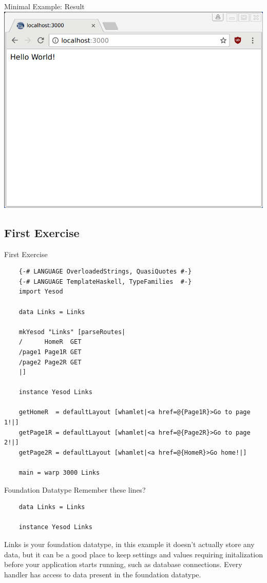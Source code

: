 \documentclass[pdf]{beamer}
\begin{document}
\begin{frame}{Minimal Example: Result}
  \includegraphics[width=\textwidth,height=0.8\textheight,keepaspectratio]{example}
\end{frame}

\subsection{First Exercise}
\begin{frame}[fragile]{First Exercise}
  \begin{verbatim}
    {-# LANGUAGE OverloadedStrings, QuasiQuotes #-}
    {-# LANGUAGE TemplateHaskell, TypeFamilies  #-}
    import Yesod

    data Links = Links

    mkYesod "Links" [parseRoutes|
    /      HomeR  GET
    /page1 Page1R GET
    /page2 Page2R GET
    |]

    instance Yesod Links

    getHomeR  = defaultLayout [whamlet|<a href=@{Page1R}>Go to page 1!|]
    getPage1R = defaultLayout [whamlet|<a href=@{Page2R}>Go to page 2!|]
    getPage2R = defaultLayout [whamlet|<a href=@{HomeR}>Go home!|]

    main = warp 3000 Links
  \end{verbatim}
\end{frame}

\begin{frame}[fragile]{Foundation Datatype}
  Remember these lines?
  \begin{verbatim}
    data Links = Links

    instance Yesod Links
  \end{verbatim}
  \pause
  
  Links is your foundation datatype, in this example it doesn't
  actually store any data, but it can be a good place to keep settings
  and values requiring initalization before your application starts
  running, such as database connections. Every handler has access to
  data present in the foundation datatype.
\end{frame}
\end{document}
